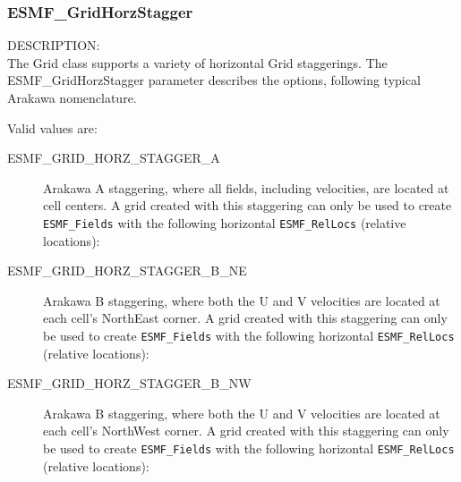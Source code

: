  \subsubsection{ESMF\_GridHorzStagger}

 {\sf DESCRIPTION:\\}
 The Grid class supports a variety of horizontal Grid staggerings.  The
 {ESMF\_GridHorzStagger} parameter describes the options, following typical
 Arakawa nomenclature.

 Valid values are:
 \begin{description}
    \item [ESMF\_GRID\_HORZ\_STAGGER\_A]
          Arakawa A staggering, where all fields, including velocities, are
          located at cell centers.  A grid created with this staggering can
          only be used to create {\tt ESMF\_Fields} with the following
          horizontal {\tt ESMF\_RelLocs} (relative locations):

    \item [ESMF\_GRID\_HORZ\_STAGGER\_B\_NE]
          Arakawa B staggering, where both the U and V velocities are located at
          each cell's NorthEast corner.  A grid created with this staggering can
          only be used to create {\tt ESMF\_Fields} with the following
          horizontal {\tt ESMF\_RelLocs} (relative locations):

    \item [ESMF\_GRID\_HORZ\_STAGGER\_B\_NW]
          Arakawa B staggering, where both the U and V velocities are located at
          each cell's NorthWest corner.  A grid created with this staggering can
          only be used to create {\tt ESMF\_Fields} with the following
          horizontal {\tt ESMF\_RelLocs} (relative locations):
 

\end{description}
